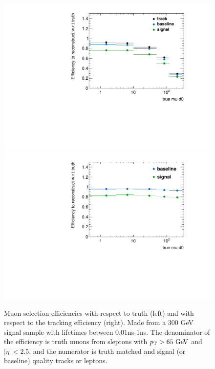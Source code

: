 \begin{figure}[htbp]
\centering
\includegraphics[width=.48\textwidth]{figures/disp_systs/signal_effcompare_d0_mu_300.pdf}
\includegraphics[width=.48\textwidth]{figures/disp_systs/signal_effwrttrack_d0_mu_300.pdf}
\caption{Muon selection efficiencies with respect to truth (left) and with respect to the tracking efficiency (right). Made from a 300 GeV signal sample with lifetimes between 0.01ns-1ns. The denominator of the efficiency is truth muons from sleptons with $\pt > 65 \GeV$ and $|\eta| < 2.5$, and the numerator is truth matched and signal (or baseline) quality tracks or leptons.}
\label{fig:disp_mu}
\end{figure}



